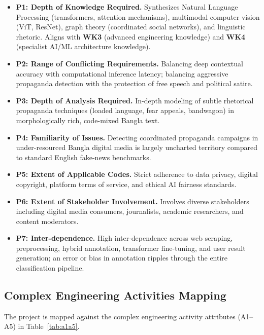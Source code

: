 \documentclass[12pt,a4paper]{report}
\begin{document}
\begin{itemize}
  \item \textbf{P1: Depth of Knowledge Required.} Synthesizes Natural Language
        Processing (transformers, attention mechanisms), multimodal computer vision
        (ViT, ResNet), graph theory (coordinated social networks), and linguistic
        rhetoric. Aligns with \textbf{WK3} (advanced engineering knowledge) and
        \textbf{WK4} (specialist AI/ML architecture knowledge).
  \item \textbf{P2: Range of Conflicting Requirements.} Balancing deep contextual
        accuracy with computational inference latency; balancing aggressive
        propaganda detection with the protection of free speech and political
        satire.
  \item \textbf{P3: Depth of Analysis Required.} In-depth modeling of subtle
        rhetorical propaganda techniques (loaded language, fear appeals,
        bandwagon) in morphologically rich, code-mixed Bangla text.
  \item \textbf{P4: Familiarity of Issues.} Detecting coordinated propaganda
        campaigns in under-resourced Bangla digital media is largely uncharted
        territory compared to standard English fake-news benchmarks.
  \item \textbf{P5: Extent of Applicable Codes.} Strict adherence to data privacy,
        digital copyright, platform terms of service, and ethical AI fairness
        standards.
  \item \textbf{P6: Extent of Stakeholder Involvement.} Involves diverse
        stakeholders including digital media consumers, journalists, academic
        researchers, and content moderators.
  \item \textbf{P7: Inter-dependence.} High inter-dependence across web scraping,
        preprocessing, hybrid annotation, transformer fine-tuning, and user result
        generation; an error or bias in annotation ripples through the entire
        classification pipeline.
\end{itemize}

\subsection{Complex Engineering Activities Mapping}
The project is mapped against the complex engineering activity attributes
(A1--A5) in Table~\ref{tab:a1a5}.
\end{document}

